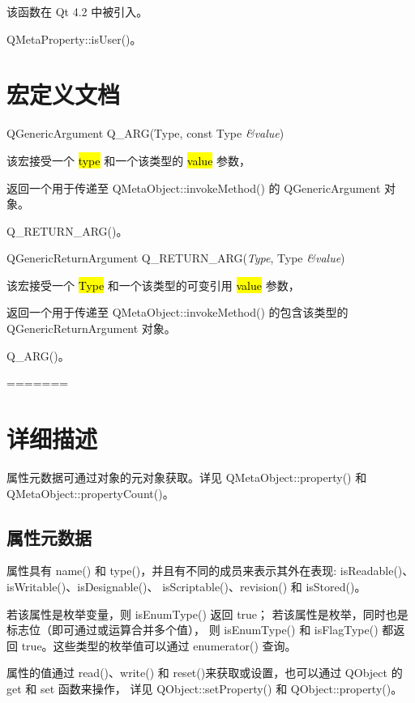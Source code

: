 该函数在 Qt 4.2 中被引入。

\begin{notice}[另请参阅]
QMetaProperty::isUser()。
\end{notice}

\section{宏定义文档}

QGenericArgument Q\_ARG(Type, const Type \emph{\&value})

该宏接受一个 \hl{type} 和一个该类型的 \hl{value} 参数，

返回一个用于传递至 QMetaObject::invokeMethod() 的 QGenericArgument 对象。

\begin{notice}[另请参阅]
Q\_RETURN\_ARG()。
\end{notice} 

QGenericReturnArgument Q\_RETURN\_ARG(\emph{Type}, Type \emph{\&value})

该宏接受一个 \hl{Type} 和一个该类型的可变引用 \hl{value} 参数，

返回一个用于传递至 QMetaObject::invokeMethod() 的包含该类型的 QGenericReturnArgument 对象。

\begin{notice}[另请参阅]
Q\_ARG()。
\end{notice} 
=======
\section{详细描述}

属性元数据可通过对象的元对象获取。详见 QMetaObject::property() 和 QMetaObject::propertyCount()。

\subsection{属性元数据}

属性具有 name() 和 type()，并且有不同的成员来表示其外在表现: isReadable()、isWritable()、isDesignable()、
isScriptable()、revision() 和 isStored()。

若该属性是枚举变量，则 isEnumType() 返回 true；
若该属性是枚举，同时也是标志位（即可通过或运算合并多个值），
则 isEnumType() 和 isFlagType() 都返回 true。这些类型的枚举值可以通过 enumerator() 查询。

属性的值通过 read()、write() 和 reset()来获取或设置，也可以通过 QObject 的 get 和 set 函数来操作，
详见 QObject::setProperty() 和 QObject::property()。

